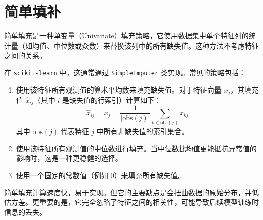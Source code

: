 \section{简单填补}

\begin{definition}[简单填充]
    简单填充是一种单变量（Univariate）填充策略，它使用数据集中单个特征列的统计量（如均值、中位数或众数）来替换该列中的所有缺失值。这种方法不考虑特征之间的关系。
\end{definition}

在 \texttt{scikit-learn} 中，这通常通过 \texttt{SimpleImputer} 类实现。常见的策略包括：
\begin{enumerate}
    \item
          \begin{definition}
              使用该特征所有观测值的算术平均数来填充缺失值。对于特征向量 $x_j$，其填充值 $\hat{x}_{ij}$（其中 $i$ 是缺失值的行索引）计算如下：
              $$
                  \hat{x}_{ij} = \bar{x}_j = \frac{1}{|\text{obs}(j)|} \sum_{k \in \text{obs}(j)} x_{kj}
              $$
              其中 $\text{obs}(j)$ 代表特征 $j$ 中所有非缺失值的索引集合。
          \end{definition}
    \item
          \begin{definition}[中位数填充]
              使用该特征所有观测值的中位数进行填充。当中位数比均值更能抵抗异常值的影响时，这是一种更稳健的选择。
          \end{definition}
    \item
          \begin{definition}[常数填充]
              使用一个固定的常数值（例如 0）来填充所有缺失值。
          \end{definition}
\end{enumerate}

\begin{tips}
    简单填充计算速度快，易于实现。但它的主要缺点是会扭曲数据的原始分布，并低估方差。更重要的是，它完全忽略了特征之间的相关性，可能导致后续模型训练时信息的丢失。
\end{tips}